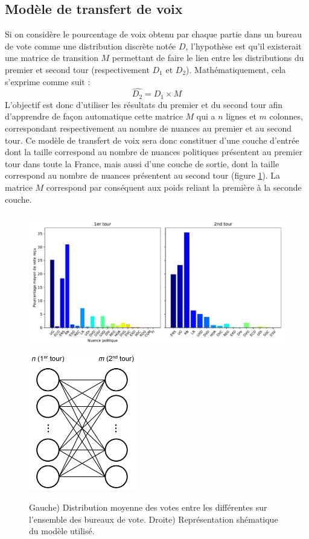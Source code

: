 \documentclass[11pt]{article}
\begin{document}
        \subsection*{Modèle de transfert de voix}
            Si on considère le pourcentage de voix obtenu par chaque partie dans un bureau de vote comme une distribution discrète notée $D$, l'hypothèse est qu'il existerait une matrice de transition $M$ permettant de faire le lien entre les distributions du premier et second tour (respectivement $D_1$ et $D_2$). Mathématiquement, cela s'exprime comme suit :
            \begin{equation}
                \hat{D_2} = D_1 \times M
            \end{equation}
            L'objectif est donc d'utiliser les résultats du premier et du second tour afin d'apprendre de façon automatique cette matrice $M$ qui a $n$ lignes et $m$ colonnes, correspondant respectivement au nombre de nuances au premier et au second tour. Ce modèle de transfert de voix sera donc constituer d'une couche d'entrée dont la taille correspond au nombre de nuances politiques présentent au premier tour dans toute la France, mais aussi d'une couche de sortie, dont la taille correspond au nombre de nuances présentent au second tour (figure \ref{fig:Model}). La matrice $M$ correspond par conséquent aux poids reliant la première à la seconde couche. 
            
            \begin{figure}
                \begin{center}
                    \includegraphics[height=6cm]{Distribution_votes_1er_et_2nd_tour.pdf}
                    \includegraphics[height=6cm]{Model_transfert_Voix.png}
                    \caption{Gauche) Distribution moyenne des votes entre les différentes sur l'ensemble des bureaux de vote. Droite) Représentation shématique du modèle utilisé.}
                    \label{fig:Model}
                \end{center}
            \end{figure}
\end{document}
